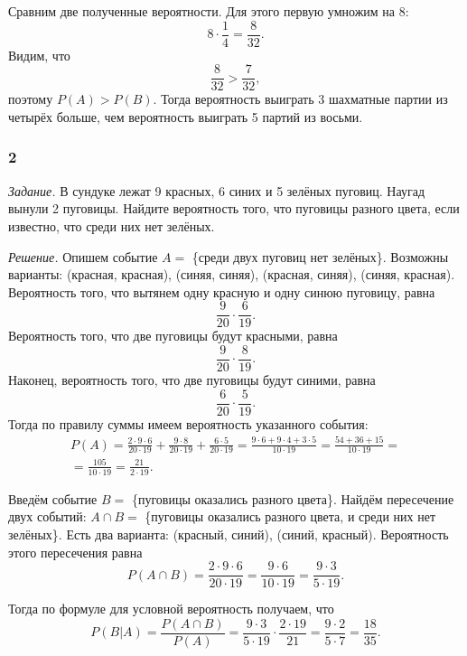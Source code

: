 Сравним две полученные вероятности.
Для этого первую умножим на 8:
$$8 \cdot \frac{1}{4} =
\frac{8}{32}.$$
Видим, что
$$ \frac{8}{32} > \frac{7}{32},$$
поэтому $P \left( A \right) > P \left( B \right) $.
Тогда вероятность выиграть 3 шахматные партии из четырёх больше, чем вероятность выиграть 5 партий из восьми.

\subsubsection*{2}

\textit{Задание.} В сундуке лежат 9 красных, 6 синих и 5 зелёных пуговиц.
Наугад вынули 2 пуговицы.
Найдите вероятность того, что пуговицы разного цвета, если известно, что среди них нет зелёных.

\textit{Решение.} Опишем событие $A =$ \{среди двух пуговиц нет зелёных\}.
Возможны варианты: (красная, красная), (синяя, синяя), (красная, синяя), (синяя, красная).
Вероятность того, что вытянем одну красную и одну синюю пуговицу, равна
$$ \frac{9}{20} \cdot \frac{6}{19}.$$
Вероятность того, что две пуговицы будут красными, равна
$$ \frac{9}{20} \cdot \frac{8}{19}.$$
Наконец, вероятность того, что две пуговицы будут синими, равна
$$ \frac{6}{20} \cdot \frac{5}{19}.$$
Тогда по правилу суммы имеем вероятность указанного события:
\begin{equation*}
\begin{split}
P \left( A \right) =
\frac{2 \cdot 9 \cdot 6}{20 \cdot 19} + \frac{9 \cdot 8}{20 \cdot 19} + \frac{6 \cdot 5}{20 \cdot 19} =
\frac{9 \cdot 6 + 9 \cdot 4 + 3 \cdot 5}{10 \cdot 19} =
\frac{54 + 36 + 15}{10 \cdot 19} = \\
= \frac{105}{10 \cdot 19} =
\frac{21}{2 \cdot 19}.
\end{split}
\end{equation*}

Введём событие $B =$ \{пуговицы оказались разного цвета\}.
Найдём пересечение двух событий: $A \cap B =$ \{пуговицы оказались разного цвета, и среди них нет зелёных\}.
Есть два варианта: (красный, синий), (синий, красный).
Вероятность этого пересечения равна
$$P \left( A \cap B \right) =
\frac{2 \cdot 9 \cdot 6}{20 \cdot 19} =
\frac{9 \cdot 6}{10 \cdot 19} =
\frac{9 \cdot 3}{5 \cdot 19}.$$

Тогда по формуле для условной вероятность получаем, что
$$P \left( \left. B \right| A \right) =
\frac{P \left( A \cap B \right) }{P \left( A \right) } =
\frac{9 \cdot 3}{5 \cdot 19} \cdot \frac{2 \cdot 19}{21} =
\frac{9 \cdot 2}{5 \cdot 7} =
\frac{18}{35}.$$
